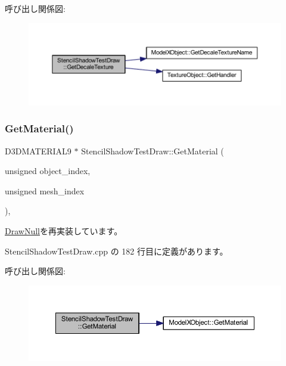 呼び出し関係図\+:\nopagebreak
\begin{figure}[H]
\begin{center}
\leavevmode
\includegraphics[width=350pt]{class_stencil_shadow_test_draw_a387a97781f743aa0ea0727c050ef53b2_cgraph}
\end{center}
\end{figure}
\mbox{\label{class_stencil_shadow_test_draw_abfc9caaaa1b6120e2013701a9d264f2d}} 
\subsubsection{\texorpdfstring{Get\+Material()}{GetMaterial()}}
{\footnotesize\ttfamily D3\+D\+M\+A\+T\+E\+R\+I\+A\+L9 $\ast$ Stencil\+Shadow\+Test\+Draw\+::\+Get\+Material (\begin{DoxyParamCaption}\item[{unsigned}]{object\+\_\+index,  }\item[{unsigned}]{mesh\+\_\+index }\end{DoxyParamCaption})\hspace{0.3cm}{\ttfamily [override]}, {\ttfamily [virtual]}}



\mbox{\hyperlink{class_draw_null_a84969d22d3436986f214e9896fe44fc6}{Draw\+Null}}を再実装しています。



 Stencil\+Shadow\+Test\+Draw.\+cpp の 182 行目に定義があります。

呼び出し関係図\+:\nopagebreak
\begin{figure}[H]
\begin{center}
\leavevmode
\includegraphics[width=350pt]{class_stencil_shadow_test_draw_abfc9caaaa1b6120e2013701a9d264f2d_cgraph}
\end{center}
\end{figure}
\mbox{\label{class_stencil_shadow_test_draw_adfa99798c61ac13f209dc99f1e2694c5}} 
